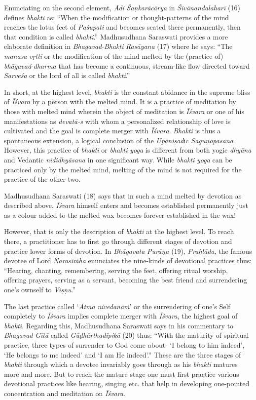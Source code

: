 Enunciating on the second element, \emph{Ādi} \emph{Śaṇkarācārya} in \emph{Śivānandalaharī} (16) defines \emph{bhakti} as: ``When the modification or thought-patterns of the mind reaches the lotus feet of \emph{Paśupati} and becomes seated there permanently, then that condition is called \emph{bhakti}.'' Madhusudhana Saraswati provides a more elaborate definition in \emph{Bhagavad}-\emph{Bhakti} \emph{Rasāyana} (17) where he says: ``The \emph{manasa} \emph{vṛtti} or the modification of the mind melted by the (practice of) \emph{bhāgavad}-\emph{dharma} that has become a continuous, stream-like flow directed toward \emph{Sarveśa} or the lord of all is called \emph{bhakti}.''

In short, at the highest level, \emph{bhakti} is the constant abidance in the supreme bliss of \emph{Īśvara} by a person with the melted mind. It is a practice of meditation by those with melted mind wherein the object of meditation is \emph{Īśvara} or one of his manifestations as \emph{devatā-s} with whom a personalized relationship of love is cultivated and the goal is complete merger with \emph{Īśvara}. \emph{Bhakti} is thus a spontaneous extension, a logical conclusion of the \emph{Upaniṣad}ic \emph{Saguṇopāsanā}. However, this practice of \emph{bhakti} or \emph{bhakti} \emph{yoga} is different from both yogic \emph{dhyāna} and Vedantic \emph{nididhyāsana} in one significant way. While \emph{bhakti} \emph{yoga} can be practiced only by the melted mind, melting of the mind is not required for the practice of the other two.

Madhusudhana Saraswati (18) says that in such a mind melted by devotion as described above, \emph{Īśvara} himself enters and becomes established permanently just as a colour added to the melted wax becomes forever established in the wax!

However, that is only the description of \emph{bhakti} at the highest level. To reach there, a practitioner has to first go through different stages of devotion and practice lower forms of devotion. In \emph{Bhāgavata} \emph{Purāṇa} (19), \emph{Prahlāda}, the famous devotee of Lord \emph{Narasiṁha} enunciates the nine-kinds of devotional practices thus: ``Hearing, chanting, remembering, serving the feet, offering ritual worship, offering prayers, serving as a servant, becoming the best friend and surrendering one's ownself to \emph{Viṣṇu}.''

The last practice called `\emph{Ātma} \emph{nivedanaṁ}' or the surrendering of one's Self completely to \emph{Īśvara} implies complete merger with \emph{Īśvara}, the highest goal of \emph{bhakti}. Regarding this, Madhusudhana Saraswati says in his commentary to \emph{Bhagavad} \emph{Gītā} called \emph{Gūḍhārthadīpikā} (20) thus: ``With the maturity of spiritual practice, three types of surrender to God come about- `I belong to him indeed', `He belongs to me indeed' and `I am He indeed'.'' These are the three stages of \emph{bhakti} through which a devotee invariably goes through as his \emph{bhakti} matures more and more. But to reach the mature stage one must first practice various devotional practices like hearing, singing etc. that help in developing one-pointed concentration and meditation on \emph{Īśvara}.

